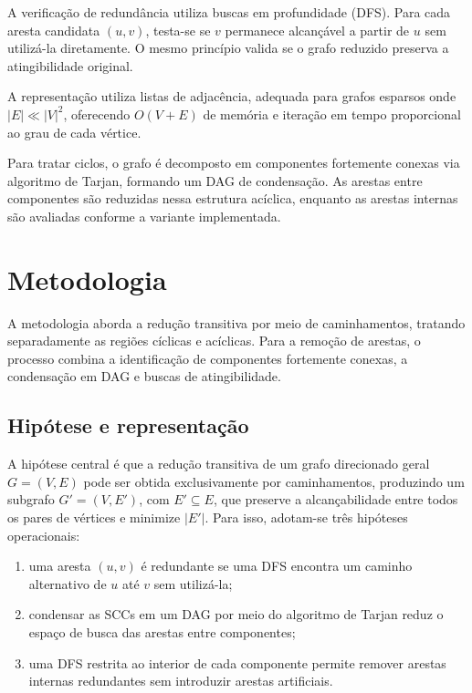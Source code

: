 \documentclass{sbc2023}%
\begin{document}
A verificação de redundância utiliza buscas em profundidade (DFS).
Para cada aresta candidata $(u, v)$, testa-se se $v$ permanece 
alcançável a partir de $u$ sem utilizá-la diretamente. O mesmo 
princípio valida se o grafo reduzido preserva a atingibilidade 
original.

A representação utiliza listas de adjacência, adequada para grafos 
esparsos onde $|E| \ll |V|^2$, oferecendo $O(V + E)$ de memória 
e iteração em tempo proporcional ao grau de cada vértice.

Para tratar ciclos, o grafo é decomposto em componentes fortemente 
conexas via algoritmo de Tarjan, formando um DAG de condensação. 
As arestas entre componentes são reduzidas nessa estrutura acíclica, 
enquanto as arestas internas são avaliadas conforme a variante 
implementada.

\section{Metodologia}

A metodologia aborda a redução transitiva por meio de caminhamentos, tratando separadamente as regiões cíclicas e acíclicas. Para a remoção de arestas, o processo combina a identificação de componentes fortemente conexas, a condensação em DAG e buscas de atingibilidade.

\subsection{Hipótese e representação}

A hipótese central é que a redução transitiva de um grafo 
direcionado geral $G = (V, E)$ pode ser obtida exclusivamente 
por caminhamentos, produzindo um subgrafo $G' = (V, E')$, 
com $E' \subseteq E$, que preserve a alcançabilidade entre 
todos os pares de vértices e minimize $|E'|$. Para isso, 
adotam-se três hipóteses operacionais:

\begin{enumerate}
    \item uma aresta $(u, v)$ é redundante se uma DFS encontra 
    um caminho alternativo de $u$ até $v$ sem utilizá-la;
    \item condensar as SCCs em um DAG por meio do algoritmo de 
    Tarjan reduz o espaço de busca das arestas entre componentes;
    \item uma DFS restrita ao interior de cada componente permite 
    remover arestas internas redundantes sem introduzir arestas 
    artificiais.
\end{enumerate}
\end{document}
